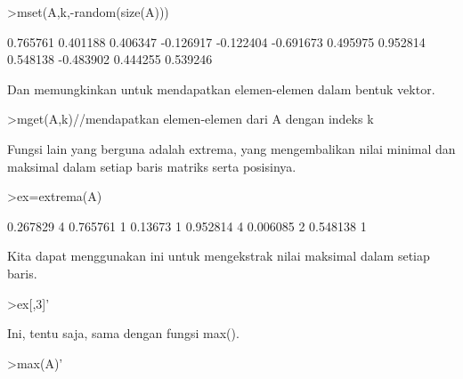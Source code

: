 \documentclass[a4paper,10pt]{article}
\begin{document}
\begin{eulernotebook}
\begin{eulercomment}
\begin{eulercomment}
\begin{eulercomment}
\end{eulercomment}
\begin{eulerprompt}
>mset(A,k,-random(size(A)))
\end{eulerprompt}
\begin{euleroutput}
       0.765761      0.401188      0.406347     -0.126917 
      -0.122404     -0.691673      0.495975      0.952814 
       0.548138     -0.483902      0.444255      0.539246 
\end{euleroutput}
\begin{eulercomment}
Dan memungkinkan untuk mendapatkan elemen-elemen dalam bentuk vektor.
\end{eulercomment}
\begin{eulerprompt}
>mget(A,k)//mendapatkan elemen-elemen dari A dengan indeks k
\end{eulerprompt}
\begin{euleroutput}
  [0.267829,  0.13673,  0.390567,  0.006085]
\end{euleroutput}
\begin{eulercomment}
Fungsi lain yang berguna adalah extrema, yang mengembalikan nilai
minimal dan maksimal dalam setiap baris matriks serta posisinya.
\end{eulercomment}
\begin{eulerprompt}
>ex=extrema(A)
\end{eulerprompt}
\begin{euleroutput}
       0.267829             4      0.765761             1 
        0.13673             1      0.952814             4 
       0.006085             2      0.548138             1 
\end{euleroutput}
\begin{eulercomment}
Kita dapat menggunakan ini untuk mengekstrak nilai maksimal dalam
setiap baris.
\end{eulercomment}
\begin{eulerprompt}
>ex[,3]'
\end{eulerprompt}
\begin{euleroutput}
  [0.765761,  0.952814,  0.548138]
\end{euleroutput}
\begin{eulercomment}
Ini, tentu saja, sama dengan fungsi max().
\end{eulercomment}
\begin{eulerprompt}
>max(A)'
\end{eulerprompt}
\begin{euleroutput}
  [0.765761,  0.952814,  0.548138]
\end{euleroutput}

\end{eulercomment}
\end{eulercomment}
\end{eulernotebook}
\end{document}
